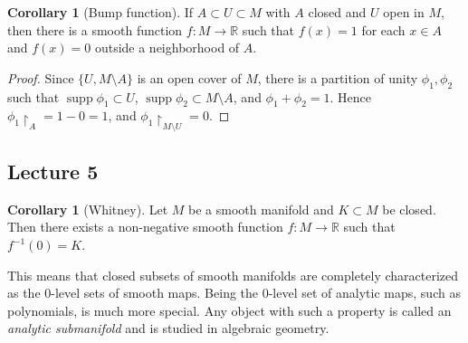 \documentclass[10pt,letterpaper,cm]{nupset}
\theoremstyle{definition}
\theoremstyle{theorem}
\newtheorem{corollary}[definition]{Corollary}
\theoremstyle{remark}
\newcommand{\R}{\mathbb R}
\newcommand{\1}{\mathbf{1}}
\newcommand{\0}{\vec 0}
\DeclareMathOperator{\supp}{supp}
\begin{document}
\begin{corollary}[Bump function]
If $A \subset U \subset M$ with $A$ closed and $U$ open in $M$, then there is a  smooth function $f: M \to \R$ such that $f(x) = 1$ for each $x\in A$ and $f(x) =0$ outside a neighborhood of $A$.
\end{corollary}

\begin{proof}
Since $\{U, M \setminus A\}$ is an open cover of $M$, there is a partition of unity $\phi_1, \phi_2$ such that $\supp \phi_1 \subset U$, $\supp \phi_2 \subset M \setminus A$, and $\phi_1 + \phi_2 = 1$. Hence $\phi_1 \restriction_A = 1 - 0 = 1$, and $\phi_1 \restriction_{M\setminus U} = 0$.
\end{proof}

\subsection{Lecture 5}

\begin{corollary}[Whitney]
Let $M$ be a smooth manifold and $K \subset M$ be closed. Then there exists a non-negative smooth function $f: M \to \R$ such that $f^{-1}(0) =K$.
\end{corollary}

This means that closed subsets of smooth manifolds are completely characterized as the $0$-level sets of smooth maps. Being the $0$-level set of analytic maps, such as polynomials, is much more special. Any object with such a property is called an \textit{analytic submanifold} and is studied in algebraic geometry.
\end{document}
